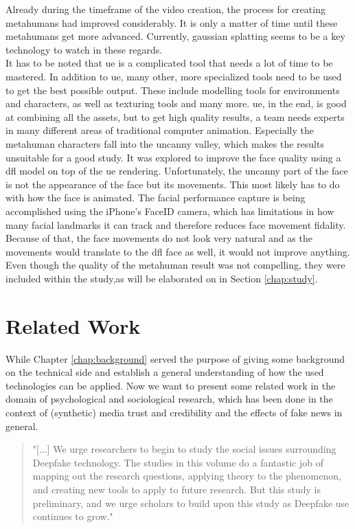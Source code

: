\documentclass[
  a4paper,  %
  twoside,  %
  bibliography=totoc,
  headsepline,
  cleardoublepage=empty,
  parskip=half,
  draft=false
]{scrbook}
\begin{document}
Already during the timeframe of the video creation, the process for creating metahumans had improved considerably. It is only a matter of time until these metahumans get more advanced. Currently, gaussian splatting seems to be a key technology to watch in these regards. \\
It has to be noted that \gls{ue} is a complicated tool that needs a lot of time to be mastered. In addition to \gls{ue}, many other, more specialized tools need to be used to get the best possible output. These include modelling tools for environments and characters, as well as texturing tools and many more. \gls{ue}, in the end, is good at combining all the assets, but to get high quality results, a team needs experts in many different areas of traditional computer animation. Especially the metahuman characters fall into the uncanny valley, which makes the results unsuitable for a good study. It was explored to improve the face quality using a \gls{dfl} model on top of the \gls{ue} rendering. Unfortunately, the uncanny part of the face is not the appearance of the face but its movements. This most likely has to do with how the face is animated. The facial performance capture is being accomplished using the iPhone's FaceID camera, which has limitations in how many facial landmarks it can track and therefore reduces face movement fidality. Because of that, the face movements do not look very natural and as the movements would translate to the \gls{dfl} face as well, it would not improve anything. \\
Even though the quality of the metahuman result was not compelling, they were included  within the study,as will be elaborated on in Section \ref{chap:study}. 

\chapter{Related Work}
\label{chap:rel-work}
While Chapter \ref{chap:background} served the purpose of giving some background on the technical side and establish a general understanding of how the used technologies can be applied. Now we want to present some related work in the domain of psychological and sociological research, which has been done in the context of (synthetic) media trust and credibility and the effects of fake news in general. 

\begin{quotation}
  "[...] We urge researchers to begin to study the social issues surrounding Deepfake technology. The studies in this volume do a fantastic job of mapping out the research questions, applying theory to the phenomenon, and creating new tools to apply to future research. But this study is preliminary, and we urge scholars to build upon this study as Deepfake use continues to grow." \cite{hancockSocialImpactDeepfakes2021}
\end{quotation}
\end{document}

